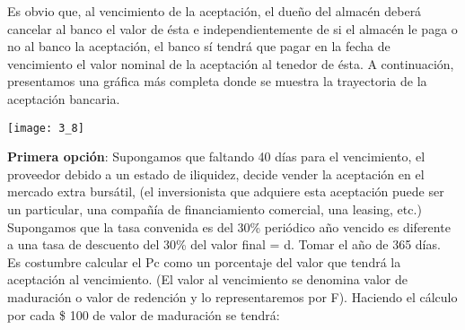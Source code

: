 	Es obvio que, al vencimiento de la aceptación, el dueño del almacén deberá cancelar al banco el valor de ésta e independientemente de si el almacén le paga o no al banco la aceptación, el banco sí tendrá que pagar en la fecha de vencimiento el valor nominal de la aceptación al tenedor de ésta. A continuación, presentamos una gráfica más completa donde se muestra la trayectoria de la aceptación bancaria.\\
	
	\begin{center}
		\texttt{[image: 3\_8]}
	\end{center}	
	
	\textbf{Primera opción}: Supongamos que faltando 40 días para el vencimiento, el proveedor debido a un estado de iliquidez, decide vender la aceptación en el mercado extra bursátil, (el inversionista que adquiere esta aceptación puede ser un particular, una compañía de financiamiento comercial, una leasing, etc.) Supongamos que la tasa convenida es del 30\% periódico año vencido es diferente a una tasa de descuento del 30\% del valor final = d. Tomar el año de 365 días.\\
	Es costumbre calcular el Pc como un porcentaje del valor que tendrá la aceptación al vencimiento. (El valor al vencimiento se denomina valor de maduración o valor de redención y lo representaremos por F).
	Haciendo el cálculo por cada \$ 100 de valor de maduración se tendrá: \\\\\\\\\\\\\\
	
